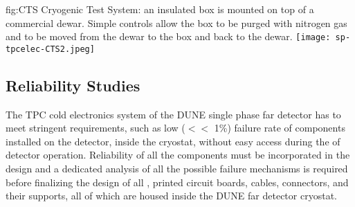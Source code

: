 \begin{dunefigure}
{fig:CTS}
{Cryogenic Test System: an insulated box is mounted on top of a commercial \lntwo dewar.  Simple controls allow the box to be purged with nitrogen gas and \lntwo to be moved from the dewar to the box and back to the dewar.}
\texttt{[image: sp-tpcelec-CTS2.jpeg]}
\end{dunefigure}

\subsection{Reliability Studies}
\label{sec:fdsp-tpcelec-qa-reliability}

The TPC cold electronics system of the DUNE single phase far detector has to meet 
stringent requirements, such as low ($<<$ 1\%) failure rate of components installed 
on the detector, inside the cryostat, without easy access during the \dunelifetime of 
detector operation. Reliability of all the components must be incorporated in the 
design and a dedicated analysis of all the possible failure mechanisms is required 
before finalizing the design of all , printed circuit boards, cables, 
connectors, and their supports, all of which are housed inside the DUNE far detector 
cryostat. 

